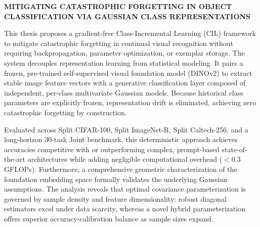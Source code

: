 \begin{center}
	\textbf{\MakeUppercase{Mitigating Catastrophic Forgetting in Object Classification via Gaussian Class Representations
	}}
\end{center}

This thesis proposes a gradient-free Class-Incremental Learning (CIL) framework to mitigate catastrophic forgetting in continual visual recognition without requiring backpropagation, parameter optimization, or exemplar storage. The system decouples representation learning from statistical modeling. It pairs a frozen, pre-trained self-supervised visual foundation model (DINOv2) to extract stable image feature vectors with a generative classification layer composed of independent, per-class multivariate Gaussian models. Because historical class parameters are explicitly frozen, representation drift is eliminated, achieving zero catastrophic forgetting by construction. 

Evaluated across Split CIFAR-100, Split ImageNet-R, Split Caltech-256, and a long-horizon 30-task Joint benchmark, this deterministic approach achieves accuracies competitive with or outperforming complex, prompt-based state-of-the-art architectures while adding negligible computational overhead ($<0.3$ GFLOPs). Furthermore, a comprehensive geometric characterization of the foundation embedding space formally validates the underlying Gaussian assumptions. The analysis reveals that optimal covariance parameterization is governed by sample density and feature dimensionality: robust diagonal estimators excel under data scarcity, whereas a novel hybrid parameterization offers superior accuracy-calibration balance as sample sizes expand.



